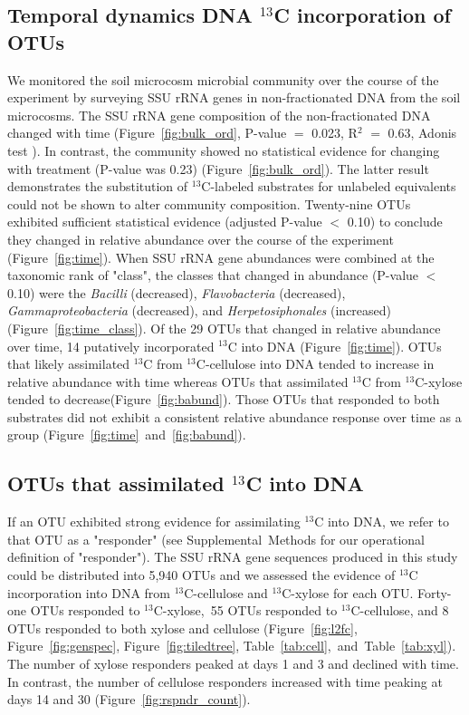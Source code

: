 \subsection{Temporal dynamics DNA $^{13}$C incorporation of OTUs}
We monitored the soil microcosm microbial community over the course of the
experiment by surveying SSU rRNA genes in non-fractionated DNA from the soil
microcosms. The SSU rRNA gene composition of the non-fractionated DNA changed
with time (Figure~\ref{fig:bulk_ord}, P-value $=$ 0.023, R$^{2}$ $=$ 0.63,
Adonis test \citep{Anderson2001a}). In contrast, the community showed no
statistical evidence for changing with treatment (P-value was 0.23)
(Figure~\ref{fig:bulk_ord}). The latter result demonstrates the substitution of
$^{13}$C-labeled substrates for unlabeled equivalents could not be shown to
alter community composition. Twenty-nine OTUs exhibited sufficient statistical
evidence (adjusted P-value $<$ 0.10) to conclude they changed in relative
abundance over the course of the experiment (Figure~\ref{fig:time}). When
SSU rRNA gene abundances were combined at the taxonomic rank of "class", the
classes that changed in abundance (P-value $<$ 0.10) were the \textit{Bacilli}
(decreased), \textit{Flavobacteria} (decreased), \textit{Gammaproteobacteria}
(decreased), and \textit{Herpetosiphonales} (increased)
(Figure~\ref{fig:time_class}). Of the 29 OTUs that changed in relative
abundance over time, 14 putatively incorporated $^{13}$C into DNA
(Figure~\ref{fig:time}). OTUs that likely assimilated $^{13}$C from
$^{13}$C-cellulose into DNA tended to increase in relative abundance with time
whereas OTUs that assimilated $^{13}$C from $^{13}$C-xylose tended to
decrease(Figure~\ref{fig:babund}). Those OTUs that responded to both substrates did not
exhibit a consistent relative abundance response over time as a group
(Figure~\ref{fig:time}~and~\ref{fig:babund}).

\subsection{OTUs that assimilated $^{13}$C into DNA} \label{responders}
If an OTU exhibited strong evidence for assimilating $^{13}$C into DNA, we
refer to that OTU as a "responder" (see Supplemental Methods for our
operational definition of "responder"). The SSU rRNA gene sequences produced in
this study could be distributed into 5,940 OTUs and we assessed the evidence of
$^{13}$C incorporation into DNA from $^{13}$C-cellulose and $^{13}$C-xylose for
each OTU. Forty-one OTUs responded to $^{13}$C-xylose,~55 OTUs responded to
$^{13}$C-cellulose, and 8 OTUs responded to both xylose and cellulose
(Figure~\ref{fig:l2fc}, Figure~\ref{fig:genspec}, Figure~\ref{fig:tiledtree},
Table~\ref{tab:cell},~and~Table~\ref{tab:xyl}). The number of xylose responders
peaked at days 1 and 3 and declined with time. In contrast, the number of
cellulose responders increased with time peaking at days 14 and 30
(Figure~\ref{fig:rspndr_count}). 

